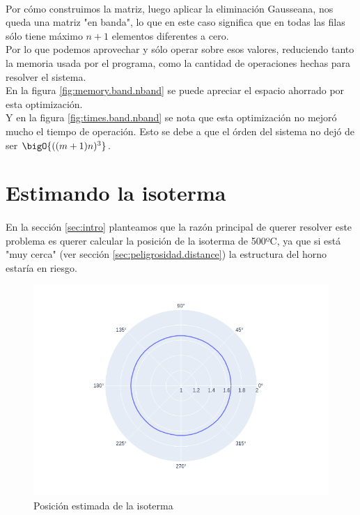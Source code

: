 \documentclass[12pt]{article}
\begin{document}
\paragraph{} Por cómo construimos la matriz, luego aplicar la eliminación Gausseana, nos queda una matriz "en banda", lo que en este caso significa que en todas las filas sólo tiene máximo \(n+1\) elementos diferentes a cero. \\
Por lo que podemos aprovechar y sólo operar sobre esos valores, reduciendo tanto la memoria usada por el programa, como la cantidad de operaciones hechas para resolver el sistema. \\
En la figura \ref{fig:memory.band.nband} se puede apreciar el espacio ahorrado por esta optimización. \\
Y en la figura \ref{fig:times.band.nband} se nota que esta optimización no mejoró mucho el tiempo de operación. Esto se debe a que el órden del sistema no dejó de ser \(\bigO{((m+1)n)^3}\). %


\section{Estimando la isoterma}
\label{sec:peligrosidad}

\paragraph{} En la sección \ref{sec:intro} planteamos que la razón principal de querer resolver este problema es querer calcular la posición de la isoterma de 500ºC, ya que si está "muy cerca" (ver sección \ref{sec:peligrosidad.distance}) la estructura del horno estaría en riesgo.

\begin{figure}[H]
\centering
\includegraphics[scale=0.5]{complete.0.isotherm}
\caption{Posición estimada de la isoterma}
\label{fig:isotherm.pos}
\end{figure}
\end{document}
